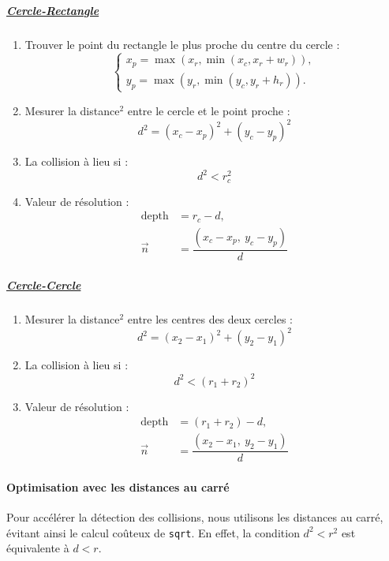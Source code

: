 \documentclass[a4paper,11pt]{article}
\begin{document}
\noindent
\begin{minipage}[t]{0.48\textwidth}
\subparagraph*{\underline{\small\textbf{Cercle-Rectangle}}}
\begin{enumerate}[leftmargin=*,topsep=2pt,itemsep=2pt]
    \item Trouver le point du rectangle le plus proche du centre du cercle : 
    \[
    \begin{cases} 
        x_p = \max(x_r, \min(x_c, x_r + w_r)), \\[2pt]
        y_p = \max(y_r, \min(y_c, y_r + h_r)).
    \end{cases}
    \]
    \item Mesurer la distance\(^2\) entre le cercle et le point proche :  
    \[
    d^2 = (x_c - x_p)^2 + (y_c - y_p)^2
    \]
    \item La collision à lieu si  :  
    \[
    d^2 < r_c^2
    \]
    \item Valeur de résolution :  
    \[
    \boxed{
        \begin{aligned}
            \text{depth} &= r_c - d, \\[2pt]
            \vec{n} &= \dfrac{(x_c - x_p,\ y_c - y_p)}{d}
        \end{aligned}
    }
    \]
\end{enumerate}
\end{minipage}
\hfill
\begin{minipage}[t]{0.48\textwidth}
\subparagraph*{\underline{\small\textbf{Cercle-Cercle}}}
\begin{enumerate}[leftmargin=*,topsep=2pt,itemsep=2pt]
    \item Mesurer la distance\(^2\) entre les centres des deux cercles :  
    \[
    d^2 = (x_2 - x_1)^2 + (y_2 - y_1)^2
    \]
    \item La collision à lieu si :  
    \[
    d^2 < (r_1 + r_2)^2
    \]
    \item Valeur de résolution : 
    \[
    \boxed{
        \begin{aligned}
            \text{depth} &= (r_1 + r_2) - d, \\[2pt]
            \vec{n} &= \dfrac{(x_2 - x_1,\ y_2 - y_1)}{d}
        \end{aligned}
    }
    \]
\end{enumerate}
\end{minipage}

\paragraph{Optimisation avec les distances au carré}
\label{sec:optimisation}
Pour accélérer la détection des collisions, nous utilisons les distances au carré, évitant ainsi le calcul coûteux de \texttt{sqrt}. En effet, la condition \(d^2 < r^2\) est équivalente à \(d < r\).
\end{document}
